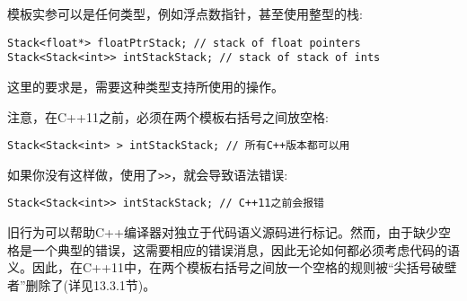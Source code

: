 模板实参可以是任何类型，例如浮点数指针，甚至使用整型的栈:

\begin{lstlisting}[style=styleCXX]
Stack<float*> floatPtrStack; // stack of float pointers
Stack<Stack<int>> intStackStack; // stack of stack of ints
\end{lstlisting}

这里的要求是，需要这种类型支持所使用的操作。

注意，在C++11之前，必须在两个模板右括号之间放空格:

\begin{lstlisting}[style=styleCXX]
Stack<Stack<int> > intStackStack; // 所有C++版本都可以用
\end{lstlisting}

如果你没有这样做，使用了\texttt{>>}，就会导致语法错误:

\begin{lstlisting}[style=styleCXX]
Stack<Stack<int>> intStackStack; // C++11之前会报错
\end{lstlisting}

旧行为可以帮助C++编译器对独立于代码语义源码进行标记。然而，由于缺少空格是一个典型的错误，这需要相应的错误消息，因此无论如何都必须考虑代码的语义。因此，在C++11中，在两个模板右括号之间放一个空格的规则被“尖括号破壁者”删除了(详见13.3.1节)。





















